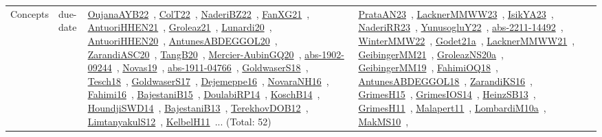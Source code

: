 {\begin{longtable}{lp{3cm}>{\raggedright\arraybackslash}p{6cm}>{\raggedright\arraybackslash}p{6cm}>{\raggedright\arraybackslash}p{8cm}}
Concepts & due-date & \href{works/OujanaAYB22.pdf}{OujanaAYB22}~\cite{OujanaAYB22}, \href{works/ColT22.pdf}{ColT22}~\cite{ColT22}, \href{works/NaderiBZ22.pdf}{NaderiBZ22}~\cite{NaderiBZ22}, \href{works/FanXG21.pdf}{FanXG21}~\cite{FanXG21}, \href{works/AntuoriHHEN21.pdf}{AntuoriHHEN21}~\cite{AntuoriHHEN21}, \href{works/Groleaz21.pdf}{Groleaz21}~\cite{Groleaz21}, \href{works/Lunardi20.pdf}{Lunardi20}~\cite{Lunardi20}, \href{works/AntuoriHHEN20.pdf}{AntuoriHHEN20}~\cite{AntuoriHHEN20}, \href{works/AntunesABDEGGOL20.pdf}{AntunesABDEGGOL20}~\cite{AntunesABDEGGOL20}, \href{works/ZarandiASC20.pdf}{ZarandiASC20}~\cite{ZarandiASC20}, \href{works/TangB20.pdf}{TangB20}~\cite{TangB20}, \href{works/Mercier-AubinGQ20.pdf}{Mercier-AubinGQ20}~\cite{Mercier-AubinGQ20}, \href{works/abs-1902-09244.pdf}{abs-1902-09244}~\cite{abs-1902-09244}, \href{works/Novas19.pdf}{Novas19}~\cite{Novas19}, \href{works/abs-1911-04766.pdf}{abs-1911-04766}~\cite{abs-1911-04766}, \href{works/GoldwaserS18.pdf}{GoldwaserS18}~\cite{GoldwaserS18}, \href{works/Tesch18.pdf}{Tesch18}~\cite{Tesch18}, \href{works/GoldwaserS17.pdf}{GoldwaserS17}~\cite{GoldwaserS17}, \href{works/Dejemeppe16.pdf}{Dejemeppe16}~\cite{Dejemeppe16}, \href{works/NovaraNH16.pdf}{NovaraNH16}~\cite{NovaraNH16}, \href{works/Fahimi16.pdf}{Fahimi16}~\cite{Fahimi16}, \href{works/BajestaniB15.pdf}{BajestaniB15}~\cite{BajestaniB15}, \href{works/DoulabiRP14.pdf}{DoulabiRP14}~\cite{DoulabiRP14}, \href{works/KoschB14.pdf}{KoschB14}~\cite{KoschB14}, \href{works/HoundjiSWD14.pdf}{HoundjiSWD14}~\cite{HoundjiSWD14}, \href{works/BajestaniB13.pdf}{BajestaniB13}~\cite{BajestaniB13}, \href{works/TerekhovDOB12.pdf}{TerekhovDOB12}~\cite{TerekhovDOB12}, \href{works/LimtanyakulS12.pdf}{LimtanyakulS12}~\cite{LimtanyakulS12}, \href{works/KelbelH11.pdf}{KelbelH11}~\cite{KelbelH11}... (Total: 52) & \href{works/PrataAN23.pdf}{PrataAN23}~\cite{PrataAN23}, \href{works/LacknerMMWW23.pdf}{LacknerMMWW23}~\cite{LacknerMMWW23}, \href{works/IsikYA23.pdf}{IsikYA23}~\cite{IsikYA23}, \href{works/NaderiRR23.pdf}{NaderiRR23}~\cite{NaderiRR23}, \href{works/YunusogluY22.pdf}{YunusogluY22}~\cite{YunusogluY22}, \href{works/abs-2211-14492.pdf}{abs-2211-14492}~\cite{abs-2211-14492}, \href{works/WinterMMW22.pdf}{WinterMMW22}~\cite{WinterMMW22}, \href{works/Godet21a.pdf}{Godet21a}~\cite{Godet21a}, \href{works/LacknerMMWW21.pdf}{LacknerMMWW21}~\cite{LacknerMMWW21}, \href{works/GeibingerMM21.pdf}{GeibingerMM21}~\cite{GeibingerMM21}, \href{works/GroleazNS20a.pdf}{GroleazNS20a}~\cite{GroleazNS20a}, \href{works/GeibingerMM19.pdf}{GeibingerMM19}~\cite{GeibingerMM19}, \href{works/FahimiOQ18.pdf}{FahimiOQ18}~\cite{FahimiOQ18}, \href{works/AntunesABDEGGOL18.pdf}{AntunesABDEGGOL18}~\cite{AntunesABDEGGOL18}, \href{works/ZarandiKS16.pdf}{ZarandiKS16}~\cite{ZarandiKS16}, \href{works/GrimesH15.pdf}{GrimesH15}~\cite{GrimesH15}, \href{works/GrimesIOS14.pdf}{GrimesIOS14}~\cite{GrimesIOS14}, \href{works/HeinzSB13.pdf}{HeinzSB13}~\cite{HeinzSB13}, \href{works/GrimesH11.pdf}{GrimesH11}~\cite{GrimesH11}, \href{works/Malapert11.pdf}{Malapert11}~\cite{Malapert11}, \href{works/LombardiM10a.pdf}{LombardiM10a}~\cite{LombardiM10a}, \href{works/MakMS10.pdf}{MakMS10}~\cite{MakMS10}, 
\end{longtable}}
